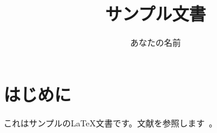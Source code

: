 \documentclass{article}
\title{サンプル文書}
\author{あなたの名前}
\begin{document}
\maketitle

\section{はじめに}
これはサンプルのLaTeX文書です。文献を参照します~\cite{sample2024}。

\end{document}
